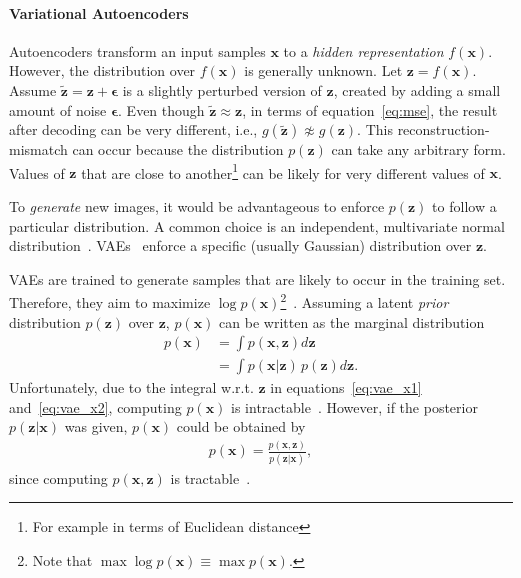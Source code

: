 \paragraph{Variational Autoencoders}

Autoencoders transform an input samples $\bm{x}$ to a \textit{hidden representation} $f(\bm{x})$.
However, the distribution over $f(\bm{x})$ is generally unknown.
Let $\bm{z} = f(\bm{x})$.
Assume $\bm{\tilde{z}} = \bm{z} + \bm{\epsilon}$ is a slightly perturbed version of $\bm{z}$, created by adding a small amount of noise $\bm{\epsilon}$.
Even though $\bm{\tilde{z}} \approx \bm{z}$, in terms of equation~\ref{eq:mse}, the result after decoding can be very different, i.e., $g(\bm{\tilde{z}}) \not\approx g(\bm{z})$.
This reconstruction-mismatch can occur because the distribution $p(\bm{z})$ can take any arbitrary form.
Values of $\bm{z}$ that are close to another\footnote{For example in terms of Euclidean distance} can be likely for very different values of $\bm{x}$.

To \textit{generate} new images, it would be advantageous to enforce $p(\bm{z})$ to follow a particular distribution.
A common choice is an independent, multivariate normal distribution~\citep[pp. 24, 25]{kingma2019introduction}.
\acp{VAE}~\citep{kingma2014autoencoding} enforce a specific (usually Gaussian) distribution over $\bm{z}$.

\acp{VAE} are trained to generate samples that are likely to occur in the training set.
Therefore, they aim to maximize $\log p(\bm{x})$\footnote{Note that $\max \log  p(\bm{x}) \equiv \max  p(\bm{x})$.}~\citep[p. 18]{kingma2019introduction}.
Assuming a latent \textit{prior} distribution $p(\bm{z})$ over $\bm{z}$, $p(\bm{x})$ can be written as the marginal distribution
\begin{align}
    p(\bm{x}) &= \int p(\bm{x}, \bm{z})d\bm{z} \label{eq:vae_x1}\\
    &= \int p(\bm{x}|\bm{z})\,p(\bm{z})d\bm{z}. \label{eq:vae_x2}
\end{align}
Unfortunately, due to the integral w.r.t. $\bm{z}$ in equations~\ref{eq:vae_x1} and~\ref{eq:vae_x2}, computing $p(\bm{x})$ is intractable~\citep[p. 13]{kingma2019introduction}.
However, if the posterior $p(\bm{z}|\bm{x})$ was given, $p(\bm{x})$ could be obtained by
\begin{align}
    p(\bm{x}) = \frac{p(\bm{x}, \bm{z})}{p(\bm{z}|\bm{x})},
\end{align}
since computing $p(\bm{x}, \bm{z})$ is tractable~\citep[p. 14]{kingma2019introduction}.

